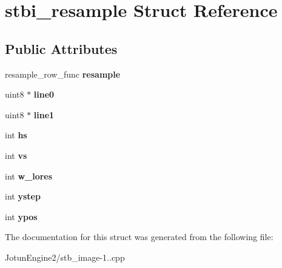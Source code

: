 \hypertarget{structstbi__resample}{\section{stbi\-\_\-resample Struct Reference}
\label{structstbi__resample}
}
\subsection*{Public Attributes}
\begin{DoxyCompactItemize}
\item 
\hypertarget{structstbi__resample_a94091463ebc5933cdaf7a813025b6e19}{resample\-\_\-row\-\_\-func {\bfseries resample}}\label{structstbi__resample_a94091463ebc5933cdaf7a813025b6e19}

\item 
\hypertarget{structstbi__resample_a30c51395efffb663b183d7c64def6db3}{uint8 $\ast$ {\bfseries line0}}\label{structstbi__resample_a30c51395efffb663b183d7c64def6db3}

\item 
\hypertarget{structstbi__resample_ac1165a6da3cf652b951056667f89b1f2}{uint8 $\ast$ {\bfseries line1}}\label{structstbi__resample_ac1165a6da3cf652b951056667f89b1f2}

\item 
\hypertarget{structstbi__resample_a1513390ba0102364169a52ff26d5e0f2}{int {\bfseries hs}}\label{structstbi__resample_a1513390ba0102364169a52ff26d5e0f2}

\item 
\hypertarget{structstbi__resample_a331c717f53239339c0c678f92a7bf4d5}{int {\bfseries vs}}\label{structstbi__resample_a331c717f53239339c0c678f92a7bf4d5}

\item 
\hypertarget{structstbi__resample_a41d43c7b0d6caafbf0dfa8ef064bd2a2}{int {\bfseries w\-\_\-lores}}\label{structstbi__resample_a41d43c7b0d6caafbf0dfa8ef064bd2a2}

\item 
\hypertarget{structstbi__resample_a0c479143447d103e73348c89f8b4ef1c}{int {\bfseries ystep}}\label{structstbi__resample_a0c479143447d103e73348c89f8b4ef1c}

\item 
\hypertarget{structstbi__resample_aa1f1ad33e739f7a38fbad8752f64f983}{int {\bfseries ypos}}\label{structstbi__resample_aa1f1ad33e739f7a38fbad8752f64f983}

\end{DoxyCompactItemize}


The documentation for this struct was generated from the following file\-:\begin{DoxyCompactItemize}
\item 
Jotun\-Engine2/stb\-\_\-image-\/1..\-cpp\end{DoxyCompactItemize}
